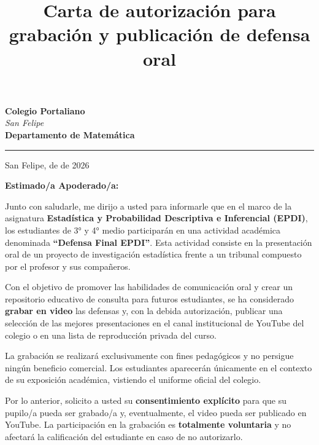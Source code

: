 \documentclass[
  spanish,
  11pt,
  letterpaper,
  DIV=11,
  numbers=noendperiod]{scrartcl}
\title{Carta de autorización para grabación y publicación de defensa
oral}
\author{}
\date{}
\begin{document}
\maketitle


\thispagestyle{empty}
\begin{center}
    \textbf{\Large Colegio Portaliano}\\[0.3cm]
    \textit{San Felipe}\\[0.3cm]
    \textbf{Departamento de Matemática}\\[0.5cm]
    \hrule
\end{center}

\vspace{0.5cm}

\begin{flushright}
    San Felipe, \hspace{3cm} de \hspace{2cm} de 2026
\end{flushright}

\vspace{0.5cm}

\textbf{Estimado/a Apoderado/a:}

Junto con saludarle, me dirijo a usted para informarle que en el marco
de la asignatura
\textbf{Estadística y Probabilidad Descriptiva e Inferencial (EPDI)},
los estudiantes de 3° y 4° medio participarán en una actividad académica
denominada \textbf{“Defensa Final EPDI”}. Esta actividad consiste en la
presentación oral de un proyecto de investigación estadística frente a
un tribunal compuesto por el profesor y sus compañeros.

Con el objetivo de promover las habilidades de comunicación oral y crear
un repositorio educativo de consulta para futuros estudiantes, se ha
considerado \textbf{grabar en video} las defensas y, con la debida
autorización, publicar una selección de las mejores presentaciones en el
canal institucional de YouTube del colegio o en una lista de
reproducción privada del curso.

La grabación se realizará exclusivamente con fines pedagógicos y no
persigue ningún beneficio comercial. Los estudiantes aparecerán
únicamente en el contexto de su exposición académica, vistiendo el
uniforme oficial del colegio.

Por lo anterior, solicito a usted su \textbf{consentimiento explícito}
para que su pupilo/a pueda ser grabado/a y, eventualmente, el video
pueda ser publicado en YouTube. La participación en la grabación es
\textbf{totalmente voluntaria} y no afectará la calificación del
estudiante en caso de no autorizarlo.
\end{document}
